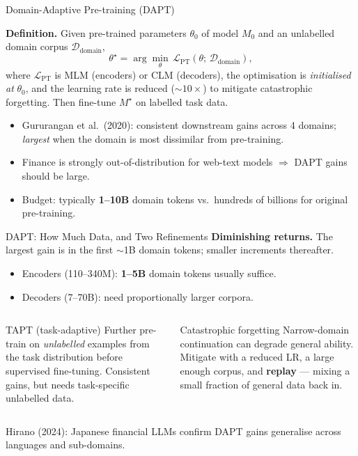 \documentclass[9pt,t]{beamer}
\begin{document}
\begin{frame}{Domain-Adaptive Pre-training (DAPT)}
\begin{underhood}
\textbf{Definition.} Given pre-trained parameters $\theta_0$ of model $M_0$ and an
unlabelled domain corpus $\mathcal{D}_{\text{domain}}$,
\[
  \theta^\star = \arg\min_\theta \, \mathcal{L}_{\text{PT}}(\theta;\,
  \mathcal{D}_{\text{domain}}),
\]
where $\mathcal{L}_{\text{PT}}$ is MLM (encoders) or CLM (decoders), the optimisation
is \emph{initialised at} $\theta_0$, and the learning rate is reduced ($\sim 10\times$)
to mitigate catastrophic forgetting. Then fine-tune $M^\star$ on labelled task data.
\end{underhood}

\medskip
\begin{itemize}
  \item Gururangan et al.\ (2020): consistent downstream gains across 4 domains;
        \emph{largest} when the domain is most dissimilar from pre-training.
  \item Finance is strongly out-of-distribution for web-text models $\Rightarrow$
        DAPT gains should be large.
  \item Budget: typically \textbf{1--10B} domain tokens vs.\ hundreds of billions
        for original pre-training.
\end{itemize}
\end{frame}

\begin{frame}{DAPT: How Much Data, and Two Refinements}
\textbf{Diminishing returns.} The largest gain is in the first $\sim$1B domain
tokens; smaller increments thereafter.
\begin{itemize}
  \item Encoders (110--340M): \textbf{1--5B} domain tokens usually suffice.
  \item Decoders (7--70B): need proportionally larger corpora.
\end{itemize}

\medskip
\begin{columns}[T]
\begin{block}{TAPT (task-adaptive)}
Further pre-train on \emph{unlabelled} examples from the task distribution before
supervised fine-tuning. Consistent gains, but needs task-specific unlabelled data.
\end{block}
\begin{alertblock}{Catastrophic forgetting}
Narrow-domain continuation can degrade general ability. Mitigate with a reduced LR,
a large enough corpus, and \textbf{replay} --- mixing a small fraction of general
data back in.
\end{alertblock}
\end{columns}

\medskip
\footnotesize Hirano (2024): Japanese financial LLMs confirm DAPT gains generalise
across languages and sub-domains.
\end{frame}
\end{document}
